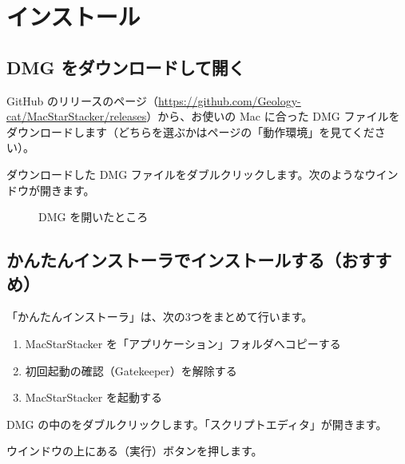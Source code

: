 \clearpage
\section{インストール}

\subsection{DMG をダウンロードして開く}

\begin{steps}
  \item GitHub のリリースのページ（\url{https://github.com/Geology-cat/MacStarStacker/releases}）から、お使いの Mac に合った DMG ファイルをダウンロードします（どちらを選ぶかは\pageref{sec:requirements}ページの「動作環境」を見てください）。
  \item ダウンロードした DMG ファイルをダブルクリックします。次のようなウインドウが開きます。
\end{steps}

\begin{figure}[H]
\centering
{}
\caption{DMG を開いたところ}
\end{figure}

\subsection{かんたんインストーラでインストールする（おすすめ）}

「かんたんインストーラ」は、次の3つをまとめて行います。
\begin{enumerate}[label=(\arabic*),itemsep=0.2ex]
  \item MacStarStacker を「アプリケーション」フォルダへコピーする
  \item 初回起動の確認（Gatekeeper）を解除する
  \item MacStarStacker を起動する
\end{enumerate}

\begin{steps}
  \item DMG の中のをダブルクリックします。「スクリプトエディタ」が開きます。
  \item ウインドウの上にある（実行）ボタンを押します。
\end{steps}

